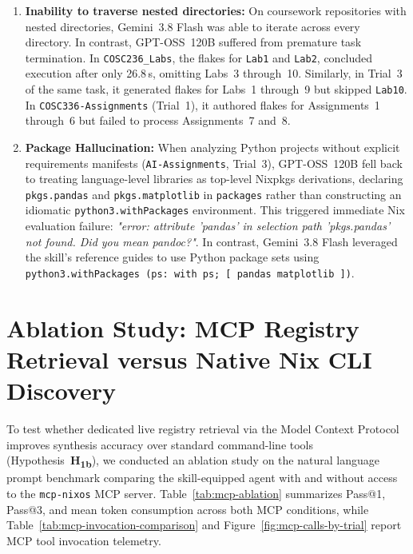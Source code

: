 \begin{enumerate}
	\item \textbf{Inability to traverse nested directories:} On coursework
	      repositories with nested directories, Gemini~3.8 Flash was able to iterate
	      across every directory. In contrast, GPT-OSS~120B suffered from premature
	      task termination. In \texttt{COSC236\_Labs}, the flakes for \texttt{Lab1}
	      and \texttt{Lab2}, concluded execution after only 26.8\,s, omitting Labs~3
	      through~10. Similarly, in Trial~3 of the same task, it generated flakes
	      for Labs~1 through~9 but skipped \texttt{Lab10}. In \texttt{COSC336-Assignments}
	      (Trial~1), it authored flakes for Assignments~1 through~6 but failed to
	      process Assignments~7 and~8.

	\item \textbf{Package Hallucination:} When analyzing Python projects without
	      explicit requirements manifests (\texttt{AI-Assignments}, Trial~3), GPT-OSS~120B
	      fell back to treating language-level libraries as top-level Nixpkgs derivations,
	      declaring \texttt{pkgs.pandas} and \texttt{pkgs.matplotlib} in \texttt{packages}
	      rather than constructing an idiomatic \texttt{python3.withPackages}
	      environment. This triggered immediate Nix evaluation failure: \textit{"error:
		      attribute 'pandas' in selection path 'pkgs.pandas' not found. Did you mean
		      pandoc?"}. In contrast, Gemini~3.8 Flash leveraged the skill's reference guides
	      to use Python package sets using \texttt{python3.withPackages (ps: with
	      ps; [ pandas matplotlib ])}.
\end{enumerate}

\section{Ablation Study: MCP Registry Retrieval versus Native Nix CLI Discovery}
\label{sec:telemetry-analysis}

To test whether dedicated live registry retrieval via the Model Context Protocol
improves synthesis accuracy over standard command-line tools (Hypothesis~\textbf{H\textsubscript{1b}}),
we conducted an ablation study on the natural language prompt benchmark
comparing the skill-equipped agent with and without access to the \texttt{mcp-nixos}
MCP server. Table~\ref{tab:mcp-ablation} summarizes Pass@1, Pass@3, and mean
token consumption across both MCP conditions, while Table~\ref{tab:mcp-invocation-comparison}
and Figure~\ref{fig:mcp-calls-by-trial} report MCP tool invocation telemetry.

